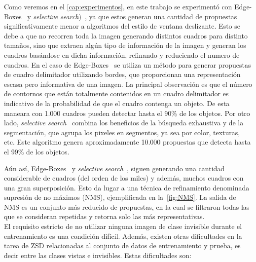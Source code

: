 Como veremos en el \autoref{cap:experimentos}, en este trabajo se experimentó con Edge-Boxes~\cite{zitnick2014edge} y \textit{selective search})~\cite{uijlings2013selective}, ya que estos generan una cantidad de propuestas significativamente menor a algoritmos del estilo de ventana deslizante. Esto se debe a que no recorren toda la imagen generando distintos cuadros para distinto tamaños, sino que extraen algún tipo de información de la imagen y generan los cuadros basándose en dicha información, refinando y reduciendo el numero de cuadros. En el caso de Edge-Boxes~\cite{zitnick2014edge} se utiliza un método para generar propuestas de cuadro delimitador utilizando bordes, que proporcionan una representación escasa pero informativa de una imagen. La principal observación es que el número de contornos que están totalmente contenidos en un cuadro delimitador es indicativo de la probabilidad de que el cuadro contenga un objeto. De esta maneara con 1.000 cuadros pueden detectar hasta el 90\% de los objetos. Por otro lado, \textit{selective search}~\cite{uijlings2013selective} combina los beneficios de la búsqueda exhaustiva y de la segmentación, que agrupa los pixeles en segmentos, ya sea por color, texturas, etc. Este algoritmo genera aproximadamente 10.000 propuestas que detecta hasta el 99\% de los objetos.

Aún así, Edge-Boxes~\cite{zitnick2014edge} y \textit{selective search}~\cite{uijlings2013selective}, siguen generando una cantidad considerable de cuadros (del orden de los miles) y además, muchos cuadros con una gran superposición. Esto da lugar a una técnica de refinamiento denominada supresión de no máximos (NMS), ejemplificada en la~\autoref{fig:NMS}. La salida de NMS es un conjunto más reducido de propuestas, en la cual se filtraron todas las que se consideran repetidas y retorna solo las más representativas.\\

El requisito estricto de no utilizar ninguna imagen de clase invisible durante el entrenamiento es una condición difícil. Además, existen otras dificultades en la tarea de ZSD relacionadas al conjunto de datos de entrenamiento y prueba, es decir entre las clases vistas e invisibles. Estas dificultades son:

